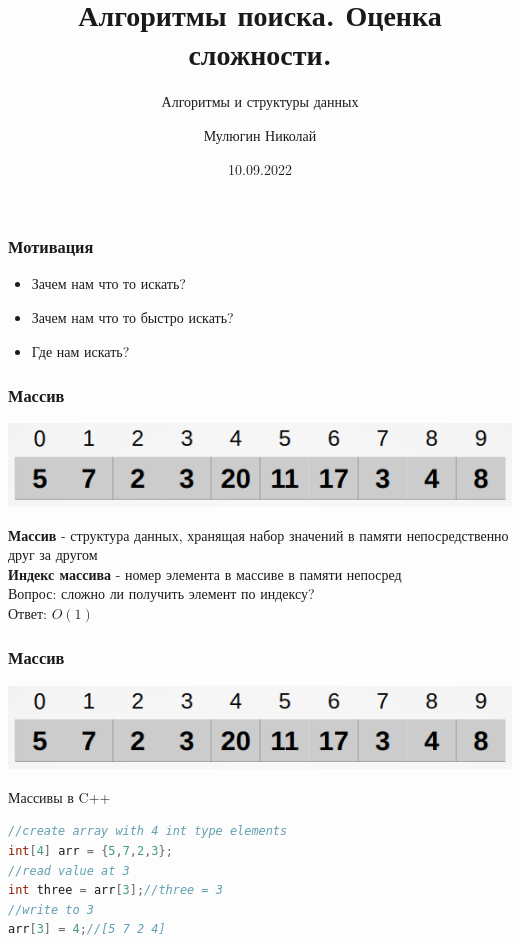 \documentclass[russian, 12pt]{beamer}
\title{Алгоритмы поиска. Оценка сложности.}
\subtitle{Алгоритмы и структуры данных}
\author{
  Мулюгин Николай
  }
\date{10.09.2022}
\begin{document}
\begin{frame}
\titlepage
\end{frame}

\begin{frame}
\frametitle{Мотивация}
  \begin{itemize}
    \item Зачем нам что то искать?\\[0.5cm]
    \pause
    \item Зачем нам что то быстро искать?\\[0.5cm]
    \pause
    \item Где нам искать?\\[0.5cm]
    

  \end{itemize}
\end{frame}
\begin{frame}
\frametitle{Массив}
\begin{center}
  \includegraphics[scale=0.5]{img/array.png}\\  
\end{center}\pause
  \textbf{Массив} - структура данных, хранящая набор значений 
  в памяти непосредственно друг за другом\\[0.3cm]\pause
  \textbf{Индекс массива} - номер элемента в массиве 
  в памяти непосред\\[0.3cm]\pause
  Вопрос: сложно ли получить элемент по индексу?\\ \pause
  Ответ: \;$O(1)$
\end{frame}
\lstset{style=mystyle}
\begin{frame}[fragile]
\frametitle{Массив}
\begin{center}
  \includegraphics[scale=0.5]{img/array.png}\\  
\end{center}
Массивы в C++
\begin{lstlisting}[language=C++]
//create array with 4 int type elements
int[4] arr = {5,7,2,3};
//read value at 3
int three = arr[3];//three = 3
//write to 3
arr[3] = 4;//[5 7 2 4]
\end{lstlisting}
\end{frame}
\end{document}
